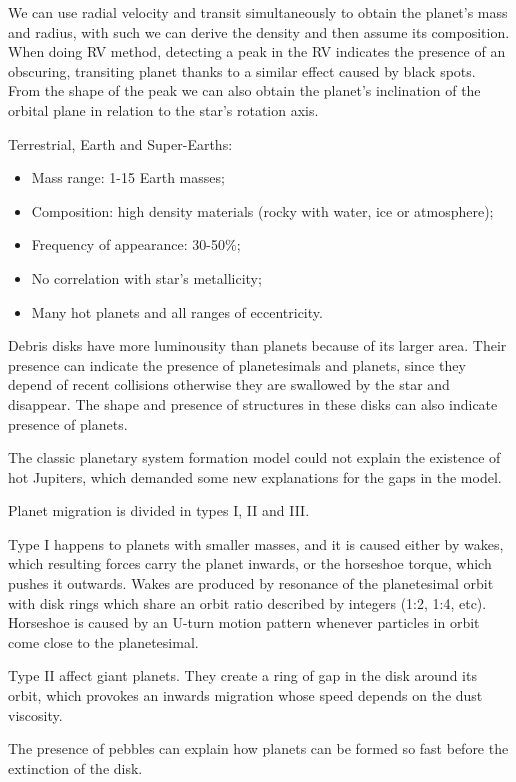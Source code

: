 \documentclass[12pt,a4paper]{article}
\begin{document}
We can use radial velocity and transit simultaneously to obtain the planet's mass and radius, with such we can derive the density and then assume its composition. When doing RV method, detecting a peak in the RV indicates the presence of an obscuring, transiting planet thanks to a similar effect caused by black spots. From the shape of the peak we can also obtain the planet's inclination of the orbital plane in relation to the star's rotation axis.

Terrestrial, Earth and Super-Earths: 
\begin{itemize}
    \item Mass range: 1-15 Earth masses;
    \item Composition: high density materials (rocky with water, ice or atmosphere);
    \item Frequency of appearance: 30-50\%;
    \item No correlation with star's metallicity;
    \item Many hot planets and all ranges of eccentricity.
\end{itemize}

Debris disks have more luminousity than planets because of its larger area. Their presence can indicate the presence of planetesimals and planets, since they depend of recent collisions otherwise they are swallowed by the star and disappear. The shape and presence of structures in these disks can also indicate presence of planets.

The classic planetary system formation model could not explain the existence of hot Jupiters, which demanded some new explanations for the gaps in the model. 

Planet migration is divided in types I, II and III. 

Type I happens to planets with smaller masses, and it is caused either by wakes, which resulting forces carry the planet inwards, or the horseshoe torque, which pushes it outwards. Wakes are produced by resonance of the planetesimal orbit with disk rings which share an orbit ratio described by integers (1:2, 1:4, etc). Horseshoe is caused by an U-turn motion pattern whenever particles in orbit come close to the planetesimal.

Type II affect giant planets. They create a ring of gap in the disk around its orbit, which provokes an inwards migration whose speed depends on the dust viscosity.

The presence of pebbles can explain how planets can be formed so fast before the extinction of the disk.
\end{document}
